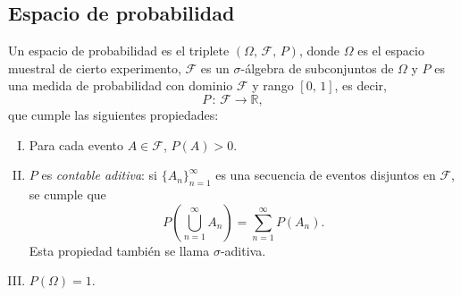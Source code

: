 \documentclass[a4paper]{report}
\begin{document}
\subsection{Espacio de probabilidad}\label{sec:probability_space}

Un espacio de probabilidad es el triplete \((\Omega,\,\mathcal{F},\,P)\), donde \(\Omega\) es el espacio muestral de cierto experimento, \(\mathcal{F}\) es un \(\sigma\)-álgebra de subconjuntos de \(\Omega\) y \(P\) es una medida de probabilidad con dominio \(\mathcal{F}\) y rango \([0,\,1]\), es decir,
\[
 P\,:\,\mathcal{F}\to \mathbb{R},
\]
que cumple las siguientes propiedades:
\begin{enumerate}[(I)]
 \item Para cada evento \(A\in\mathcal{F}\), \(P(A)>0\).
 \item \(P\) es \emph{contable aditiva}: si \(\{A_n\}_{n=1}^{\infty}\) es una secuencia de eventos disjuntos en \(\mathcal{F}\), se cumple que
 \begin{equation}\label{eq:probability_measure_countably_additive}
  P\left(\bigcup_{n=1}^{\infty}A_n\right)=\sum_{n=1}^{\infty}P(A_n).
 \end{equation}
 Esta propiedad también se llama \(\sigma\)-aditiva.
 \item \(P(\Omega)=1\).
\end{enumerate}
\end{document}
